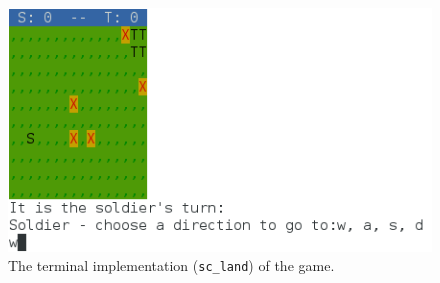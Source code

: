 \begin{figure}[ht]
\centering
\includegraphics[scale=0.6]{screenshots/terminal003.png}
\caption{The terminal implementation (\texttt{sc\_land}) of the game.}
\label{fig:terminal-screenshot-0}
\end{figure}
